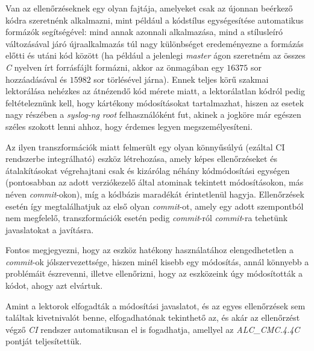 Van az ellenőrzéseknek egy olyan fajtája, amelyeket csak az újonnan beérkező kódra szeretnénk
alkalmazni, mint például a kódstílus egységesítése automatikus formázók segítségével: mind annak
azonnali alkalmazása, mind a stílusleíró változásával járó újraalkalmazás túl nagy különbséget
eredeményezne a formázás előtti és utáni kód között (ha például a jelenlegi \emph{master} ágon
szeretném az összes \emph{C} nyelven írt forrásfájlt formázni, akkor az önmagában egy $16375$ sor
hozzáadásával és $15982$ sor törlésével járna). Ennek teljes körű szakmai lektorálása nehézkes az
átnézendő kód mérete miatt, a lektorálatlan kódról pedig feltételeznünk kell, hogy kártékony
módosításokat tartalmazhat, hiszen az esetek nagy részében a \emph{syslog-ng} \emph{root}
felhasználóként fut, akinek a jogköre már egészen széles szokott lenni ahhoz, hogy érdemes legyen
megszemélyesíteni.

Az ilyen transzformációk miatt felmerült egy olyan könnyűsúlyú (ezáltal CI rendszerbe integrálható)
eszköz létrehozása, amely képes ellenőrzéseket és átalakításokat végrehajtani csak és kizárólag
néhány kódmódosítási egységen (pontosabban az adott verziókezelő által atominak tekintett
módosításokon, más néven \emph{commit}-okon), míg a kódbázis maradékát érintetlenül hagyja.
Ellenőrzések esetén így megtalálhatjuk az első olyan \emph{commit}-ot, amely egy adott szempontból
nem megfelelő, transzformációk esetén pedig \emph{commit}-ról \emph{commit}-ra tehetünk javaslatokat
a javításra.

Fontos megjegyezni, hogy az eszköz hatékony használatához elengedhetetlen a \emph{commit}-ok
jólszervezettsége, hiszen minél kisebb egy módosítás, annál könnyebb a problémáit észrevenni,
illetve ellenőrizni, hogy az eszközeink úgy módosították a kódot, ahogy azt elvártuk.

Amint a lektorok elfogadták a módosítási javaslatot, és az egyes ellenőrzések sem találtak
kivetnivalót benne, elfogadhatónak tekinthető az, és akár az ellenőrzést végző \emph{CI} rendszer
automatikusan el is fogadhatja, amellyel az \emph{ALC\_CMC.4.4C} pontját teljesítettük.

